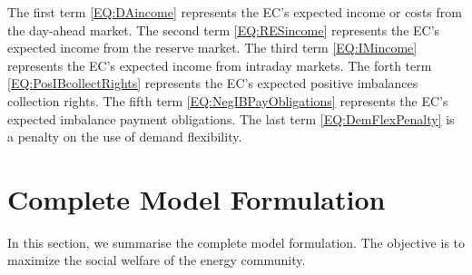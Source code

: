 \documentclass{article}
\begin{document}
The first term \eqref{EQ:DAincome} represents the EC's expected income or costs from the day-ahead market. The second term \eqref{EQ:RESincome} represents the EC's expected income from the reserve market. The third term \eqref{EQ:IMincome} represents the EC's expected income from intraday markets. The forth term \eqref{EQ:PosIBcollectRights} represents the EC's expected positive imbalances collection rights. The fifth term \eqref{EQ:NegIBPayObligations} represents the EC's expected imbalance payment obligations. The last term \eqref{EQ:DemFlexPenalty} is a penalty on the use of demand flexibility.

\section{Complete Model Formulation}
\label{SEC:CompleteModelFormulation}

In this section, we summarise the complete model formulation. The objective is to maximize the social welfare of the energy community.
\end{document}
